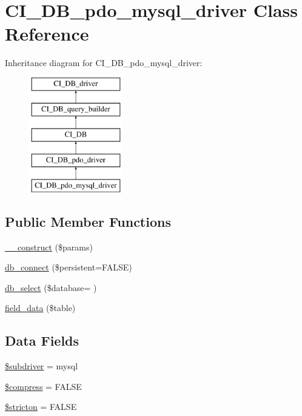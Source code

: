 \hypertarget{class_c_i___d_b__pdo__mysql__driver}{}\section{C\+I\+\_\+\+D\+B\+\_\+pdo\+\_\+mysql\+\_\+driver Class Reference}
\label{class_c_i___d_b__pdo__mysql__driver}
Inheritance diagram for C\+I\+\_\+\+D\+B\+\_\+pdo\+\_\+mysql\+\_\+driver\+:\begin{figure}[H]
\begin{center}
\leavevmode
\includegraphics[height=5.000000cm]{class_c_i___d_b__pdo__mysql__driver}
\end{center}
\end{figure}
\subsection*{Public Member Functions}
\begin{DoxyCompactItemize}
\item 
\hyperlink{class_c_i___d_b__pdo__mysql__driver_a9162320adff1a1a4afd7f2372f753a3e}{\+\_\+\+\_\+construct} (\$params)
\item 
\hyperlink{class_c_i___d_b__pdo__mysql__driver_a52bf595e79e96cc0a7c907a9b45aeb4d}{db\+\_\+connect} (\$persistent=F\+A\+L\+S\+E)
\item 
\hyperlink{class_c_i___d_b__pdo__mysql__driver_a0f25caba4648e1a5ec88fcfe767d5f12}{db\+\_\+select} (\$database= \textquotesingle{}\textquotesingle{})
\item 
\hyperlink{class_c_i___d_b__pdo__mysql__driver_a90355121e1ed009e0efdbd544ab56efa}{field\+\_\+data} (\$table)
\end{DoxyCompactItemize}
\subsection*{Data Fields}
\begin{DoxyCompactItemize}
\item 
\hyperlink{class_c_i___d_b__pdo__mysql__driver_a1322ca756348b11d080cb7a4f590de15}{\$subdriver} = \textquotesingle{}mysql\textquotesingle{}
\item 
\hyperlink{class_c_i___d_b__pdo__mysql__driver_abf799de0d30288b91ee73769281dd69d}{\$compress} = F\+A\+L\+S\+E
\item 
\hyperlink{class_c_i___d_b__pdo__mysql__driver_afb42d9811bec1da94506e5764e1439e0}{\$stricton} = F\+A\+L\+S\+E
\end{DoxyCompactItemize}
